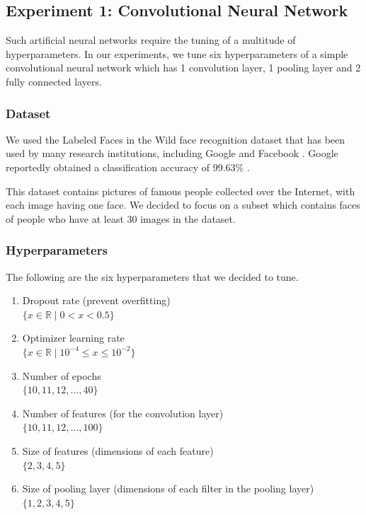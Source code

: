 \documentclass[letterpaper]{article}
\begin{document}
\subsection{Experiment 1: Convolutional Neural Network}
Such artificial neural networks require the tuning of a multitude of hyperparameters.
In our experiments, we tune six hyperparameters of a simple convolutional neural 
network which has 1 convolution layer, 1 pooling layer and 2 fully connected layers.

\subsubsection{Dataset}
We used the Labeled Faces in the Wild face recognition dataset that has been used
by many research institutions, including Google \cite{schroff2015facenet} and 
Facebook \cite{taigman2014deepface}. Google reportedly obtained a classification
accuracy of 99.63\% \cite{schroff2015facenet}.

This dataset contains pictures of famous people collected over the Internet, with 
each image having one face. We decided to focus on a subset which contains faces 
of people who have at least 30 images in the dataset.

\subsubsection{Hyperparameters}
The following are the six hyperparameters that we decided to tune.

\begin{enumerate}

    \item Dropout rate (prevent overfitting)\\
    $\{ x \in \mathbb{R} \mid 0 < x < 0.5\}$
    \item Optimizer learning rate\\
    $\{ x \in \mathbb{R} \mid 10^{-4} \leq x \leq 10^{-2}\}$
    \item Number of epochs\\
    $\{ 10, 11, 12, \ldots, 40\}$
    \item Number of features (for the convolution layer)\\
    $\{ 10, 11, 12, \ldots, 100\}$
    \item Size of features (dimensions of each feature)\\
    $\{ 2, 3, 4, 5\}$
    \item Size of pooling layer (dimensions of each filter in the pooling layer)\\
    $\{ 1, 2, 3, 4, 5\}$

\end{enumerate}
\end{document}
